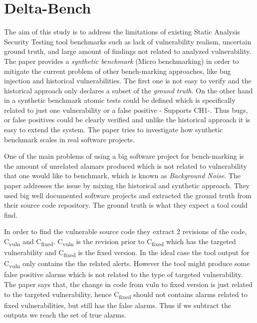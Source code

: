 \documentclass[authoryear,preprint]{sigplanconf}
\begin{document}
\section{Delta-Bench}
\label{sec:sec_delta}
The aim of this study is to address the limitations of existing Static Analysis Security Testing tool benchmarks such as lack of vulnerability realism, uncertain ground truth, and large amount of findings not related to analyzed vulnerability\cite{8170097}. The paper provides a \textit{synthetic benchmark} (Micro benchmarking) in order to mitigate the current problem of other bench-marking approaches, like bug injection and historical vulnerabilities. The first one is not easy to verify \cite{Dahse:2014:SDS:2671225.2671288} and the historical approach only declares a subset of the \textit{ground truth}. On the other hand in a synthetic benchmark atomic tests could be defined which is specifically related to just one vulnerability or a false positive - Supports CH1-. Thus bugs, or false positives could be clearly verified and unlike the historical approach it is easy to extend the system. The paper tries to investigate how synthetic benchmark scales in real software projects. 

One of the main problems of using a big software project for bench-marking is the amount of unrelated alamars produced which is not related to vulnerability that one would like to benchmark, which is known as \textit{Background Noise}. The paper addresses the issue by mixing the historical and synthetic approach. They used big well documented software projects and extracted the ground truth from their source code repository. The ground truth is what they expect a tool could find.

In order to find the vulnerable source code they extract 2 revisions of the code, C\textsubscript{vuln} and C\textsubscript{fixed}. C\textsubscript{vuln} is the revision prior to C\textsubscript{fixed} which has the targeted vulnerability and C\textsubscript{fixed} is the fixed version. In the ideal case the tool output for C\textsubscript{vuln} only contains the the related alerts. However the tool might produce some false positive alarms which is not related to the type of targeted vulnerability. The paper says that, the change in code from vuln to fixed version is just related to the targeted vulnerability, hence C\textsubscript{fixed} should not contains alarms related to fixed vulnerabilities, but still has the false alarms. Thus if we subtract the outputs we reach the set of true alarms. 
\end{document}
